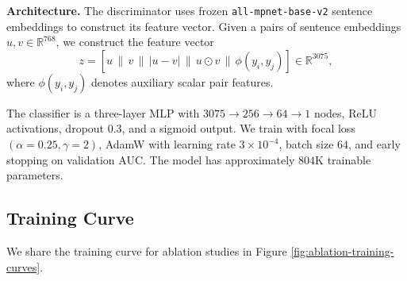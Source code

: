 \textbf{Architecture.} The discriminator uses frozen \texttt{all-mpnet-base-v2} sentence embeddings to construct its feature vector.
Given a pairs of sentence embeddings \(u,v\in\mathbb{R}^{768}\), we construct the feature vector
\[
z =
\left[
u \,\|\, v \,\|\, |u-v| \,\|\, u\odot v \,\|\, \phi(y_i,y_j)
\right]
\in \mathbb{R}^{3075},
\]
where \(\phi(y_i,y_j)\) denotes auxiliary scalar pair features. 


The classifier is a three-layer MLP with $3075 \rightarrow 256 \rightarrow 64 \rightarrow 1$ nodes, ReLU activations, dropout \(0.3\), and a sigmoid output. We train with focal loss \((\alpha=0.25,\gamma=2)\), AdamW with learning rate \(3\times10^{-4}\), batch size \(64\), and early stopping on validation AUC. The model has approximately \(804\)K trainable parameters.


\subsection{Training Curve}
We share the training curve for ablation studies in Figure \ref{fig:ablation-training-curves}.

